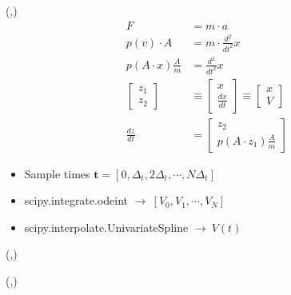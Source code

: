 \documentclass[a0]{a0poster}
\begin{document}
\begin{textblock}{3.5}(\colC,\GunY)
  \begin{align*}
    F &= m\cdot a \\
    p(v)\cdot A &= m \cdot \frac{d^2}{d t^2} x \\
    p(A\cdot x) \frac{A}{m} &= \frac{d^2}{d t^2} x \\
    \begin{bmatrix}
      z_1 \\ z_2
    \end{bmatrix}
      &\equiv 
        \begin{bmatrix}
          x \\ \frac{dx}{dt}
        \end{bmatrix} \equiv 
        \begin{bmatrix}
          x \\ V
        \end{bmatrix} \\
    \frac{dz}{dt} &= \begin{bmatrix}
                      z_2 \\ p(A\cdot z_1) \frac{A}{m}
                    \end{bmatrix}
  \end{align*}
  \begin{itemize}
  \item Sample times
    $\mathbf{t} = [0, \Delta_t, 2 \Delta_t, \cdots, N \Delta_t]$
  \item scipy.integrate.odeint $\rightarrow~[V_0, V_1, \cdots, V_N]$
  \item scipy.interpolate.UnivariateSpline $\rightarrow~V(t)$
  \end{itemize}

  
\end{textblock}

\begin{textblock}{4}(\colD,\GunY)
  \\
\end{textblock}

\begin{textblock}{4}(\colE,\GunY)
  \\
\end{textblock}
\end{document}
